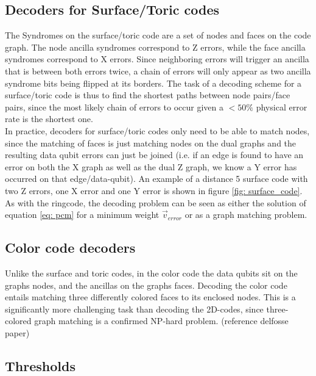 \subsection{Decoders for Surface/Toric codes}
The Syndromes on the surface/toric code are a set of nodes and
faces on the code graph. The node ancilla syndromes correspond to
Z errors, while the face ancilla syndromes correspond to X errors.
Since neighboring errors will trigger an ancilla that is between 
both errors twice, a chain of errors will only appear as two ancilla
syndrome bits being flipped at its borders.
The task of a decoding scheme for a surface/toric code is thus to
find the shortest paths between node pairs/face pairs, since the most likely
chain of errors to occur given a $<50\%$ physical error rate is the 
shortest one.\\
In practice, decoders for surface/toric codes only need to be able to
match nodes, since the matching of faces is just matching nodes on the 
dual graphs and the resulting data qubit errors can just be joined
(i.e. if an edge is found to have an error on both the X graph as well as the
dual Z graph, we know a Y error has occurred on that edge/data-qubit).
An example of a distance 5 surface code with two Z errors, one X error and
one Y error is shown in figure \ref{fig: surface_code}.
As with the ringcode, the decoding problem can be seen as either the
solution of equation \ref{eq: pcm} for a minimum weight $\vec{v}_{error}$
or as a graph matching problem.



\subsection{Color code decoders}
Unlike the surface and toric codes, in the color code the 
data qubits sit on the graphs nodes, and the ancillas on the 
graphs faces. Decoding the color code entails matching 
three differently colored faces to its enclosed nodes.
This is a significantly more challenging task than
decoding the 2D-codes, since three-colored graph matching is a confirmed
NP-hard problem. (reference delfosse paper)


\newpage
\subsection{Thresholds}

